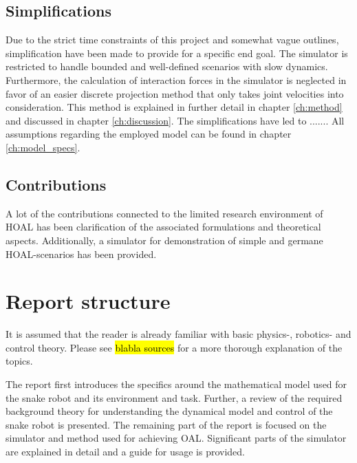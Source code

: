\subsection{Simplifications}
Due to the strict time constraints of this project and somewhat vague outlines, simplification have been made to provide for a specific end goal. The simulator is restricted to handle bounded and well-defined scenarios with slow dynamics. Furthermore, the calculation of interaction forces in the simulator is neglected in favor of an easier discrete projection method that only takes joint velocities into consideration. This method is explained in further detail in chapter \ref{ch:method} and discussed in chapter \ref{ch:discussion}. The simplifications have led to ....... 
All assumptions regarding the employed model can be found in chapter \ref{ch:model_specs}.

\subsection{Contributions}
A lot of the contributions connected to the limited research environment of HOAL has been clarification of the associated formulations and theoretical aspects. Additionally, a simulator for demonstration of simple and germane HOAL-scenarios has been provided.



\section{Report structure}
It is assumed that the reader is already familiar with basic physics-, robotics- and control theory. Please see \hl{blabla sources} for a more thorough explanation of the topics.

The report first introduces the specifics around the mathematical model used for the snake robot and its environment and task. Further, a review of the required background theory for understanding the dynamical model and control of the snake robot is presented. The remaining part of the report is focused on the simulator and method used for achieving OAL. Significant parts of the simulator are explained in detail and a guide for usage is provided. 



